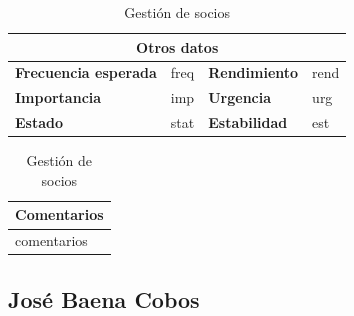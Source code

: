 \documentclass[12pt,spanish]{article}
\begin{document}
\begin{table}[H]
\vspace{1cm}

\begin{tabular}{|m{3.72cm}|m{3.72cm}|m{3.72cm}|m{3.72cm}|}
\hline
\multicolumn{4}{|c|}{\textbf{Otros datos}} \\
\hline
\textbf{Frecuencia esperada} & freq & \textbf{Rendimiento} & rend \\
\hline
\textbf{Importancia} & imp & \textbf{Urgencia} & urg \\
\hline
\textbf{Estado} & stat & \textbf{Estabilidad} & est \\
\hline
\end{tabular}

\vspace{1cm}

\begin{tabular}{|m{16.2cm}|}
\hline
\textbf{Comentarios} \\
\hline
comentarios \\
\hline
\end{tabular}

\caption{Gestión de socios}

\end{table}



\subsection{José Baena Cobos}

\end{document}

